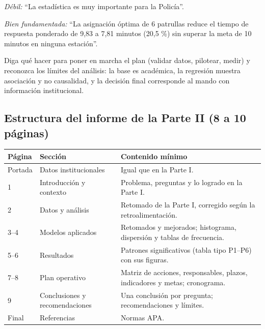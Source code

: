 \begin{cajaPaso}
\textit{Débil:} ``La estadística es muy importante para la Policía''.\par
\textit{Bien fundamentada:} ``La asignación óptima de 6 patrullas reduce el tiempo de
respuesta ponderado de 9,83 a 7,81 minutos (20,5 \%) sin superar la meta de 10 minutos en
ninguna estación''.
\end{cajaPaso}

\begin{cajaPaso}
Diga qué hacer para poner en marcha el plan (validar datos, pilotear, medir) y reconozca
los límites del análisis: la base es académica, la regresión muestra asociación y no
causalidad, y la decisión final corresponde al mando con información institucional.
\end{cajaPaso}

\subsection{Estructura del informe de la Parte II (8 a 10 páginas)}

\begin{center}
\footnotesize
\begin{tabularx}{\textwidth}{@{}p{1.7cm}p{3.6cm}X@{}}
\toprule
\textbf{Página} & \textbf{Sección} & \textbf{Contenido mínimo}\\
\midrule
Portada & Datos institucionales & Igual que en la Parte I.\\
1 & Introducción y contexto & Problema, preguntas y lo logrado en la Parte I.\\
2 & Datos y análisis & Retomado de la Parte I, corregido según la retroalimentación.\\
3--4 & Modelos aplicados & Retomados y mejorados; histograma, dispersión y tablas de frecuencia.\\
5--6 & Resultados & Patrones significativos (tabla tipo P1--P6) con sus figuras.\\
7--8 & Plan operativo & Matriz de acciones, responsables, plazos, indicadores y metas; cronograma.\\
9 & Conclusiones y recomendaciones & Una conclusión por pregunta; recomendaciones y límites.\\
Final & Referencias & Normas APA.\\
\bottomrule
\end{tabularx}
\end{center}

